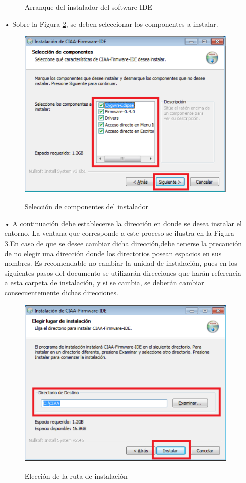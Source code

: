 \documentclass[12pt,letterpaper]{article}
\begin{document}
\begin{enumerate}
\begin{figure}[!h]
\caption{Arranque del instalador del software IDE}
\label{Fig5}
\end{figure}
\item[•]Sobre la Figura \ref{Fig6}, se deben seleccionar los componentes a instalar.
\begin{figure}[H]
\centering
\includegraphics[width=8 cm]{figuras/instalacion3.png}\\
\caption{Selección de componentes del instalador}
\label{Fig6}
\end{figure}
\item[•]A continuación debe  establecerse la dirección en donde se desea instalar el entorno. La ventana que corresponde a este proceso se ilustra en la Figura \ref{Fig7}.En caso de que se desee cambiar dicha dirección,debe tenerse la precaución de no elegir una dirección donde los directorios posean espacios en sus nombres. Es recomendable no cambiar la unidad de instalación, pues en los siguientes pasos del documento se utilizarán direcciones que harán referencia a esta carpeta de instalación, y si se cambia, se deberán cambiar consecuentemente dichas direcciones.
\begin{figure}[!h]
\centering
\includegraphics[width=8 cm]{figuras/instalacion4.png}\\
\caption{Elección de la ruta de instalación}
\label{Fig7}
\end{figure}


\end{enumerate}
\end{document}
